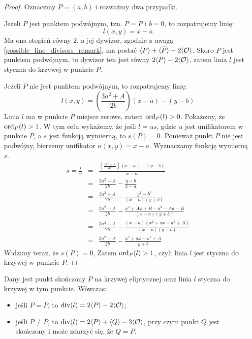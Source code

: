 \begin{proof}
Oznaczmy $P = (a, b)$ i rozważmy dwa przypadki.

Jeżeli $P$ jest punktem podwójnym, tzn. $P = \overline{P}$ i $b = 0$,
to rozpatrujemy linię:
\begin{equation}
l(x, y) = x - a
\end{equation}
Ma ona stopień równy $2$,
a jej dywizor, zgodnie z uwagą \ref{possible_line_divisors_remark},
ma postać $\langle P\rangle + \langle\overline{P}\rangle - 2\langle\mathcal{O}\rangle$.
Skoro $P$ jest punktem podwójnym, to dywizor ten jest równy
$2\langle P\rangle - 2\langle\mathcal{O}\rangle$,
zatem linia $l$ jest styczna do krzywej w punkcie $P$.

Jeżeli $P$ nie jest punktem podwójnym,
to rozpatrujemy linię:
\begin{equation}
l(x, y) = \left(\frac{3a^2 + A}{2b}\right)(x - a) - (y - b)
\end{equation}
Linia $l$ ma w punkcie $P$ miejsce zerowe, zatem $\operatorname{ord}_P(l) > 0$.
Pokażemy, że $\operatorname{ord}_P(l) > 1$.
W tym celu wykażemy, że jeśli $l = us$,
gdzie $u$ jest unifikatorem w punkcie $P$,
a $s$ jest funkcją wymierną,
to $s(P) = 0$.
Ponieważ punkt $P$ nie jest podwójny,
bierzemy unifikator $u(x, y) = x - a$.
Wyznaczamy funkcję wymierną $s$.
\begin{eqnarray*}
s = \frac{l}{u}
& = & \frac{\left(\frac{3a^2+A}{2b}\right)(x-a) - (y-b)}{x-a} \\
& = & \frac{3a^2+A}{2b} - \frac{y-b}{x-a} \\
& = & \frac{3a^2+A}{2b} - \frac{y^2-b^2}{(x-a)(y+b)} \\
& = & \frac{3a^2+A}{2b} - \frac{x^3+Ax+B - a^3-Aa-B}{(x-a)(y+b)} \\
& = & \frac{3a^2+A}{2b} - \frac{(x-a)(x^2+ax+a^2+A)}{(x-a)(y+b)} \\
& = & \frac{3a^2+A}{2b} - \frac{x^2+ax+a^2+A}{y+b}
\end{eqnarray*}
Widzimy teraz, że $s(P) = 0$,
Zatem $\operatorname{ord}_P(l) > 1$, czyli linia $l$ jest styczna do krzywej w punkcie $P$.
\end{proof}

\begin{theorem}
Dany jest punkt skończony $P$ na krzywej eliptycznej
oraz linia $l$ styczna do krzywej w tym punkcie.
Wówczas:
\begin{itemize}
\item jeśli $P = \overline{P}$,
to $\operatorname{div}(l) = 2\langle P\rangle - 2\langle\mathcal{O}\rangle$;
\item jeśli $P \neq \overline{P}$,
to $\operatorname{div}(l) = 2\langle P\rangle + \langle Q\rangle - 3\langle\mathcal{O}\rangle$,
przy czym punkt $Q$ jest skończony
i może zdarzyć się, że $Q = P$.
\end{itemize}
\end{theorem}

